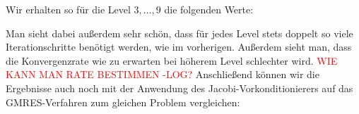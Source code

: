 \documentclass[12pt,a4paper]{scrartcl}
\numberwithin{equation}{section}
\begin{document}
\begin{figure}[H]
	\centering
\end{figure}

Wir erhalten so für die Level $3, \dots,9$ die folgenden Werte:

\begin{figure}[H]
	\centering
\end{figure}

Man sieht dabei außerdem sehr schön, dass für jedes Level stets doppelt so viele Iterationschritte benötigt werden, wie im vorherigen. Außerdem sieht man, dass die Konvergenzrate wie zu erwarten bei höherem Level schlechter wird. 
\textcolor{red}{WIE KANN MAN RATE BESTIMMEN -LOG?}
Anschließend können wir die Ergebnisse auch noch mit der Anwendung des Jacobi-Vorkonditionierers auf das GMRES-Verfahren zum gleichen Problem vergleichen:

\begin{figure}[H]
	\centering
\end{figure}
\end{document}
